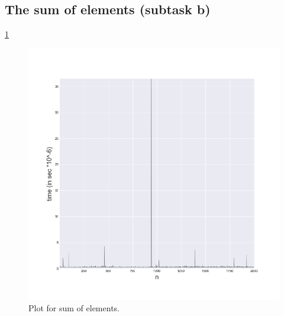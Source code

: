\documentclass[a4paper,article,14pt]{extarticle}
\begin{document}
	\subsection{The sum of elements (subtask b)}
	\ref{sum}
	\begin{figure}[h]
		\centering
		\includegraphics[scale=0.5]{sumOfVector.png}
		\caption{Plot for sum of elements.}
		\label{sum}
	\end{figure} 
\end{document}

